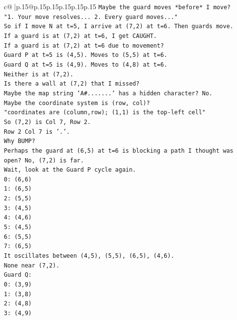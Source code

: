 \documentclass{article}
\begin{document}
{\begin{supertabular}{c@{$\;$}|p{.15\linewidth}@{}p{.15\linewidth}p{.15\linewidth}p{.15\linewidth}p{.15\linewidth}p{.15\linewidth}}
{{{\texttt{Maybe the guard moves *before* I move?} \\
\texttt{"1. Your move resolves... 2. Every guard moves..."} \\
\texttt{So if I move N at t=5, I arrive at (7,2) at t=6. Then guards move.} \\
\texttt{If a guard is at (7,2) at t=6, I get CAUGHT.} \\
\texttt{If a guard is at (7,2) at t=6 due to movement?} \\
\texttt{Guard P at t=5 is (4,5). Moves to (5,5) at t=6.} \\
\texttt{Guard Q at t=5 is (4,9). Moves to (4,8) at t=6.} \\
\texttt{Neither is at (7,2).} \\
\texttt{Is there a wall at (7,2) that I missed?} \\
\texttt{Maybe the map string `A\#.......` has a hidden character? No.} \\
\texttt{Maybe the coordinate system is (row, col)?} \\
\texttt{"coordinates are (column,row); (1,1) is the top{-}left cell"} \\
\texttt{So (7,2) is Col 7, Row 2.} \\
\texttt{Row 2 Col 7 is '.'.} \\
\texttt{Why BUMP?} \\
\texttt{Perhaps the guard at (6,5) at t=6 is blocking a path I thought was open? No, (7,2) is far.} \\
\texttt{Wait, look at the Guard P cycle again.} \\
\texttt{0: (6,6)} \\
\texttt{1: (6,5)} \\
\texttt{2: (5,5)} \\
\texttt{3: (4,5)} \\
\texttt{4: (4,6)} \\
\texttt{5: (4,5)} \\
\texttt{6: (5,5)} \\
\texttt{7: (6,5)} \\
\texttt{It oscillates between (4,5), (5,5), (6,5), (4,6).} \\
\texttt{None near (7,2).} \\
\texttt{Guard Q:} \\
\texttt{0: (3,9)} \\
\texttt{1: (3,8)} \\
\texttt{2: (4,8)} \\
\texttt{3: (4,9)} \\
}}}
\end{supertabular}}
\end{document}
